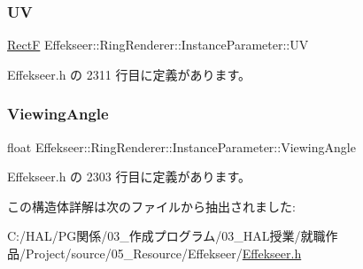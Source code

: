 \subsubsection{\texorpdfstring{UV}{UV}}
{\footnotesize\ttfamily \mbox{\hyperlink{struct_effekseer_1_1_rect_f}{RectF}} Effekseer\+::\+Ring\+Renderer\+::\+Instance\+Parameter\+::\+UV}



 Effekseer.\+h の 2311 行目に定義があります。

\mbox{\label{struct_effekseer_1_1_ring_renderer_1_1_instance_parameter_a6190409d348a699ca3959fb9416ad0a3}} 
\subsubsection{\texorpdfstring{Viewing\+Angle}{ViewingAngle}}
{\footnotesize\ttfamily float Effekseer\+::\+Ring\+Renderer\+::\+Instance\+Parameter\+::\+Viewing\+Angle}



 Effekseer.\+h の 2303 行目に定義があります。



この構造体詳解は次のファイルから抽出されました\+:\begin{DoxyCompactItemize}
\item 
C\+:/\+H\+A\+L/\+P\+G関係/03\+\_\+作成プログラム/03\+\_\+\+H\+A\+L授業/就職作品/\+Project/source/05\+\_\+\+Resource/\+Effekseer/\mbox{\hyperlink{_effekseer_8h}{Effekseer.\+h}}\end{DoxyCompactItemize}
